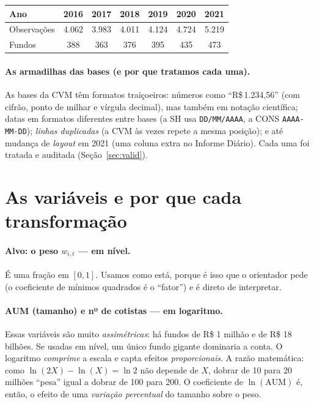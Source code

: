 \documentclass[11pt]{article}
\begin{document}
\begin{table}[h]\centering\small
\begin{tabular}{@{}lcccccc@{}}
\toprule
Ano & 2016 & 2017 & 2018 & 2019 & 2020 & 2021 \\
\midrule
Observações & 4.062 & 3.983 & 4.011 & 4.124 & 4.724 & 5.219 \\
Fundos      & 388   & 363   & 376   & 395   & 435   & 473 \\
\bottomrule
\end{tabular}
\end{table}

\paragraph{As armadilhas das bases (e por que tratamos cada uma).} As bases da CVM
têm formatos traiçoeiros: números como ``R\$\,1.234,56'' (com cifrão, ponto de
milhar e vírgula decimal), mas também em notação científica; datas em formatos
diferentes entre bases (a SH usa \texttt{DD/MM/AAAA}, a CONS \texttt{AAAA-MM-DD});
\emph{linhas duplicadas} (a CVM às vezes repete a mesma posição); e até mudança de
\emph{layout} em 2021 (uma coluna extra no Informe Diário). Cada uma foi tratada e
auditada (Seção~\ref{sec:valid}).

\section{As variáveis e por que cada transformação}

\paragraph{Alvo: o peso $w_{i,t}$ --- em nível.} É uma fração em $[0,1]$. Usamos como
está, porque é isso que o orientador pede (o coeficiente de mínimos quadrados é o
``fator'') e é direto de interpretar.

\paragraph{AUM (tamanho) e nº de cotistas --- em logaritmo.} Essas variáveis são
muito \emph{assimétricas}: há fundos de R\$ 1 milhão e de R\$ 18 bilhões. Se usadas em
nível, um único fundo gigante dominaria a conta. O logaritmo \emph{comprime} a escala
e capta efeitos \emph{proporcionais}. A razão matemática: como
$\ln(2X)-\ln(X)=\ln 2$ não depende de $X$, dobrar de 10 para 20 milhões ``pesa''
igual a dobrar de 100 para 200. O coeficiente de $\ln(\text{AUM})$ é, então, o efeito
de uma \emph{variação percentual} do tamanho sobre o peso.
\end{document}
